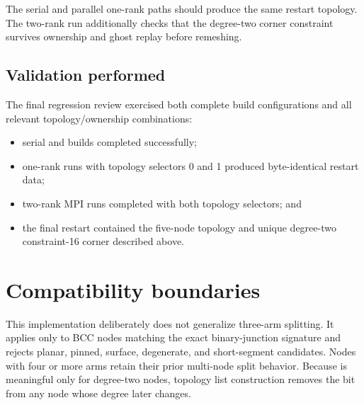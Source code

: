 \documentclass[11pt]{article}
\newcommand{\code}[1]{\texttt{\detokenize{#1}}}
\begin{document}
The serial and parallel one-rank paths should produce the same restart
topology.  The two-rank run additionally checks that the degree-two corner
constraint survives ownership and ghost replay before remeshing.

\subsection{Validation performed}

The final regression review exercised both complete build configurations and
all relevant topology/ownership combinations:

\begin{itemize}
  \item serial and \code{PARALLEL} builds completed successfully;
  \item one-rank runs with topology selectors 0 and 1 produced byte-identical
        restart data;
  \item two-rank MPI runs completed with both topology selectors; and
  \item the final restart contained the five-node topology and unique
        degree-two constraint-16 corner described above.
\end{itemize}

\section{Compatibility boundaries}

This implementation deliberately does not generalize three-arm splitting.
It applies only to BCC nodes matching the exact binary-junction signature and
rejects planar, pinned, surface, degenerate, and short-segment candidates.
Nodes with four or more arms retain their prior multi-node split behavior.
Because \code{CORNER_NODE} is meaningful only for degree-two nodes, topology
list construction removes the bit from any node whose degree later changes.
\end{document}
